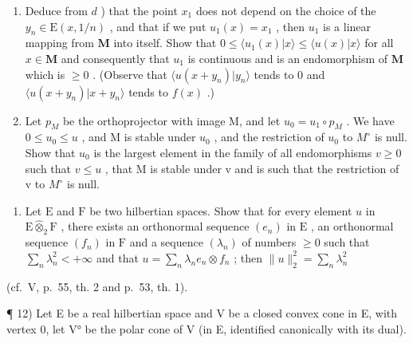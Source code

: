 \begin{enumerate}
\item
  Deduce from \(d\) ) that the point \(x_{1}\) does not depend on the choice of the \(y_{n} \in \mathrm{E}(x, 1/n)\) , and that if we put \(u_{1}(x) = x_{1}\) , then \(u_{1}\) is a linear mapping from \(\mathbf{M}\) into itself. Show that \(0 \leqslant \langle u_{1}(x)|x\rangle \leqslant \langle u(x)|x\rangle\) for all \(x \in \mathbf{M}\) and consequently that \(u_{1}\) is continuous and is an endomorphism of \(\mathbf{M}\) which is \(\geqslant 0\) . (Observe that \(\langle u(x + y_n)|y_n\rangle\) tends to 0 and \(\langle u(x + y_n)|x + y_n\rangle\) tends to \(f(x)\) .)
\item
  Let \(p_{M}\) be the orthoprojector with image M, and let \(u_{0} = u_{1} \circ p_{M}\) . We have \(0 \leqslant u_{0} \leqslant u\) , and M is stable under \(u_{0}\) , and the restriction of \(u_{0}\) to \(M^{\circ}\) is null. Show that \(u_{0}\) is the largest element in the family of all endomorphisms \(v \geqslant 0\) such that \(v \leqslant u\) , that M is stable under v and is such that the restriction of v to \(M^{\circ}\) is null.
\end{enumerate}

\begin{enumerate}
\def\labelenumi{\arabic{enumi})}
\setcounter{enumi}{10}
\tightlist
\item
  Let \(\mathrm{E}\) and \(\mathrm{F}\) be two hilbertian spaces. Show that for every element \(u\) in \(\mathrm{E} \hat{\otimes}_2 \mathrm{F}\) , there exists an orthonormal sequence \((e_n)\) in \(\mathrm{E}\) , an orthonormal sequence \((f_n)\) in \(\mathrm{F}\) and a sequence \((\lambda_n)\) of numbers \(\geqslant 0\) such that \(\sum_{n} \lambda_n^2 < +\infty\) and that \(u = \sum_{n} \lambda_n e_n \otimes f_n\) ; then \(\| u \|_2^2 = \sum_{n} \lambda_n^2\)
\end{enumerate}

(cf.~V, p.~55, th. 2 and p.~53, th. 1).

¶ 12) Let E be a real hilbertian space and V be a closed convex cone in E, with vertex 0, let V° be the polar cone of V (in E, identified canonically with its dual).

